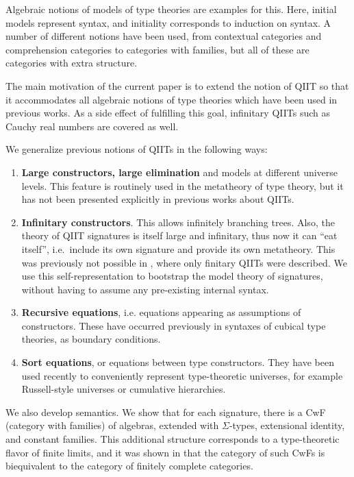 \documentclass{llncs}
\begin{document}
Algebraic notions of models of type theories are examples for this. Here,
initial models represent syntax, and initiality corresponds to induction on
syntax. A number of different notions have been used, from contextual categories
and comprehension categories to categories with families, but all of these are
categories with extra structure.

The main motivation of the current paper is to extend the notion of QIIT so that
it accommodates all algebraic notions of type theories which have been used in
previous works. As a side effect of fulfilling this goal, infinitary QIITs such
as Cauchy real numbers are covered as well.

We generalize previous notions of QIITs in the following ways:
\begin{enumerate}
  \item
  \textbf{Large constructors, large elimination} and models at different
  universe levels. This feature is routinely used in the metatheory of type
  theory, but it has not been presented explicitly in previous works about
  QIITs.
  \item
  \textbf{Infinitary constructors}. This allows infinitely branching
  trees. Also, the theory of QIIT signatures is itself large and infinitary,
  thus now it can ``eat itself'', i.e.\ include its own signature and provide
  its own metatheory. This was previously not possible in \cite{TODO}, where
  only finitary QIITs were described. We use this self-representation to
  bootstrap the model theory of signatures, without having to assume any
  pre-existing internal syntax.
  \item
  \textbf{Recursive equations}, i.e. equations appearing as assumptions
  of constructors. These have occurred previously in syntaxes of cubical type
  theories, as boundary conditions\cite{TODO}.
  \item
  \textbf{Sort equations}, or equations between type constructors. They have
  been used recently to conveniently represent type-theoretic universes, for
  example Russell-style universes\cite{TODO} or cumulative hierarchies\cite{TODO}.
\end{enumerate}

We also develop semantics. We show that for each signature, there is a CwF
(category with families) of algebras, extended with $\Sigma$-types, extensional
identity, and constant families. This additional structure corresponds to a
type-theoretic flavor of finite limits, and it was shown in \cite{TODO} that the
category of such CwFs is biequivalent to the category of finitely complete
categories.
\end{document}
